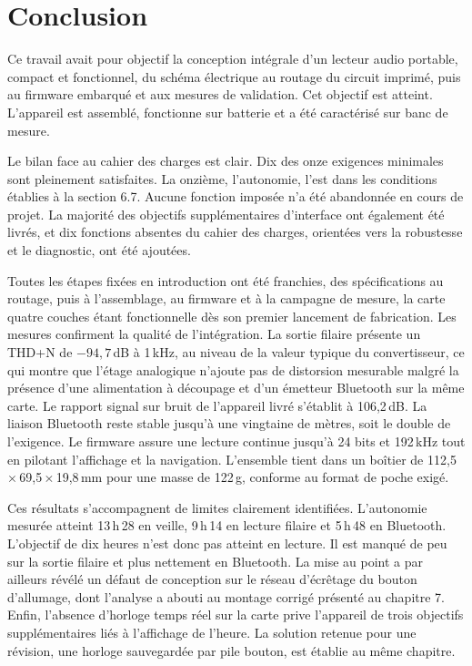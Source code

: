 \chapter{Conclusion}

Ce travail avait pour objectif la conception intégrale d'un lecteur audio portable, compact et fonctionnel, du schéma électrique au routage du circuit imprimé, puis au firmware embarqué et aux mesures de validation. Cet objectif est atteint. L'appareil est assemblé, fonctionne sur batterie et a été caractérisé sur banc de mesure.

Le bilan face au cahier des charges est clair. Dix des onze exigences minimales sont pleinement satisfaites. La onzième, l'autonomie, l'est dans les conditions établies à la section 6.7. Aucune fonction imposée n'a été abandonnée en cours de projet. La majorité des objectifs supplémentaires d'interface ont également été livrés, et dix fonctions absentes du cahier des charges, orientées vers la robustesse et le diagnostic, ont été ajoutées.

Toutes les étapes fixées en introduction ont été franchies, des spécifications au routage, puis à l'assemblage, au firmware et à la campagne de mesure, la carte quatre couches étant fonctionnelle dès son premier lancement de fabrication. Les mesures confirment la qualité de l'intégration. La sortie filaire présente un THD+N de $-94{,}7$\,dB à 1\,kHz, au niveau de la valeur typique du convertisseur, ce qui montre que l'étage analogique n'ajoute pas de distorsion mesurable malgré la présence d'une alimentation à découpage et d'un émetteur Bluetooth sur la même carte. Le rapport signal sur bruit de l'appareil livré s'établit à 106,2\,dB. La liaison Bluetooth reste stable jusqu'à une vingtaine de mètres, soit le double de l'exigence. Le firmware assure une lecture continue jusqu'à 24 bits et 192\,kHz tout en pilotant l'affichage et la navigation. L'ensemble tient dans un boîtier de 112,5\,$\times$\,69,5\,$\times$\,19,8\,mm pour une masse de 122\,g, conforme au format de poche exigé.

Ces résultats s'accompagnent de limites clairement identifiées. L'autonomie mesurée atteint 13\,h\,28 en veille, 9\,h\,14 en lecture filaire et 5\,h\,48 en Bluetooth. L'objectif de dix heures n'est donc pas atteint en lecture. Il est manqué de peu sur la sortie filaire et plus nettement en Bluetooth. La mise au point a par ailleurs révélé un défaut de conception sur le réseau d'écrêtage du bouton d'allumage, dont l'analyse a abouti au montage corrigé présenté au chapitre 7. Enfin, l'absence d'horloge temps réel sur la carte prive l'appareil de trois objectifs supplémentaires liés à l'affichage de l'heure. La solution retenue pour une révision, une horloge sauvegardée par pile bouton, est établie au même chapitre.

